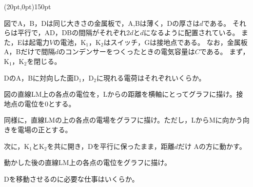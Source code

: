 \hakosyokika
\item
    \begin{mawarikomi}(20pt,0pt){150pt}{
        
        }
        図でA，B，Dは同じ大きさの金属板で，A,Bは薄く，Dの厚さは$d$である。
        それらは平行で，AD，DBの間隔がそれぞれ$2d$と$d$になるように配置されている。
        また，Eは起電力$V$の電池，$\mathrm{K_1}$，$\mathrm{K_2}$はスイッチ，Gは接地点である。
        なお，金属板A，Bだけで間隔$d$のコンデンサーをつくったときの電気容量は$C$である。
        まず，$\mathrm{K_1}$，$\mathrm{K_2}$を閉じる。
        \begin{Enumerate}
            \item DのA，Bに対向した面$\mathrm{D_1}$，$\mathrm{D_2}$に現れる電荷はそれぞれいくらか。
            \item 図の直線LM上の各点の電位を，Lからの距離を横軸にとってグラフに描け。接地点の電位を0とする。
            \item 同様に，直線LMの上の各点の電場をグラフに描け。ただし，LからMに向かう向きを電場の正とする。
        \end{Enumerate}
        次に，$\mathrm{K_1}$と$\mathrm{K_2}$を共に開き，Dを平行に保ったまま，距離$d$だけ
        Aの方に動かす。
        \begin{Enumerate*}
            \item 動かした後の直線LM上の各点の電位をグラフに描け。
            \item Dを移動させるのに必要な仕事はいくらか。
        \end{Enumerate*}
    \end{mawarikomi}
